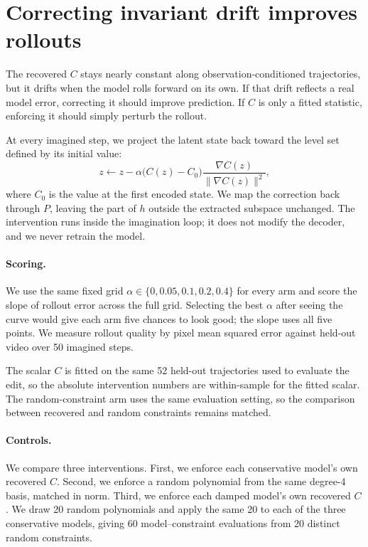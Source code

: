 \section{Correcting invariant drift improves rollouts}
\label{sec:intervention}

The recovered $C$ stays nearly constant along observation-conditioned trajectories, but it drifts
when the model rolls forward on its own. If that drift reflects a real model error, correcting it
should improve prediction. If $C$ is only a fitted statistic, enforcing it should simply perturb the
rollout.

At every imagined step, we project the latent state back toward the level set defined by its initial
value:
\begin{equation}
z \leftarrow z - \alpha\bigl(C(z)-C_0\bigr)\frac{\nabla C(z)}{\|\nabla C(z)\|^2},
\label{eq:edit}
\end{equation}
where $C_0$ is the value at the first encoded state. We map the correction back through $P$, leaving
the part of $h$ outside the extracted subspace unchanged. The intervention runs inside the
imagination loop; it does not modify the decoder, and we never retrain the model.

\paragraph{Scoring.} We use the same fixed grid $\alpha \in \{0, 0.05, 0.1, 0.2, 0.4\}$ for every arm
and score the slope of rollout error across the full grid. Selecting the best $\alpha$ after seeing
the curve would give each arm five chances to look good; the slope uses all five points. We measure
rollout quality by pixel mean squared error against held-out video over 50 imagined steps.

The scalar $C$ is fitted on the same 52 held-out trajectories used to evaluate the edit, so the
absolute intervention numbers are within-sample for the fitted scalar. The random-constraint arm
uses the same evaluation setting, so the comparison between recovered and random constraints remains
matched.

\paragraph{Controls.} We compare three interventions. First, we enforce each conservative model's own
recovered $C$. Second, we enforce a random polynomial from the same degree-4 basis, matched in norm.
Third, we enforce each damped model's own recovered $C$. We draw 20 random polynomials and apply the
same 20 to each of the three conservative models, giving 60 model--constraint evaluations from 20
distinct random constraints.

